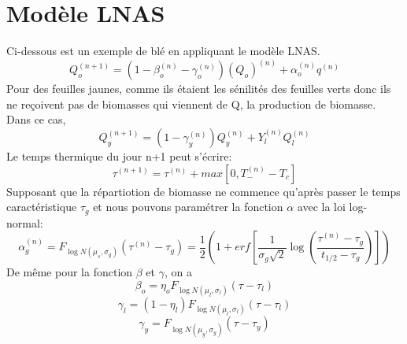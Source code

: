 \section{Modèle LNAS}
Ci-dessous est un exemple de blé en appliquant le modèle LNAS.
\[ {Q_o^{(n+1)}} = (1-\beta_o^{(n)}-\gamma_o^{(n)} )(Q_o)^{(n)} +\alpha_o^{(n)}q^{(n)} \]
Pour des feuilles jaunes, comme ils étaient les sénilités des feuilles verts donc ils ne reçoivent pas de biomasses qui viennent de Q, la production de biomasse. Dans ce cas, 
\[ {Q_y^{(n+1)}}=(1-\gamma_y^{(n)})Q_y^{(n)}+Y_l^{(n)}Q_l^{(n)} \]
Le temps thermique du jour n+1 peut s'écrire:
\[ {\tau}^{(n+1)}=\tau^{(n)}+max[0,T_-^{(n)}-T_c] \]
Supposant que la répartiotion de biomasse ne commence qu'après passer le temps caractéristique $\tau_g$ et  nous pouvons paramétrer la fonction $\alpha$ avec la loi log-normal:
\[ {\alpha_g^{(n)}}=F_{\log N(\mu_s,\sigma_g)}(\tau^{(n)}-\tau_g)=\frac{1}{2} (1+erf[\frac{1}{\sigma_g \sqrt{2}}\log (\frac{\tau^{(n)}-\tau_g}{t_{1/2}-\tau_g})]) \]
De même pour la fonction $\beta $ et $\gamma$, on a
\[ {\beta_o}=\eta_o F_{\log N(\mu_l, \sigma_l)}(\tau-\tau_l) \]
\[ {\gamma_l}=(1-\eta_l)F_{\log N(\mu_l, \sigma_l)}(\tau-\tau_l) \]
\[ {\gamma_y}=F_{\log N(\mu_y, \sigma_y)}(\tau-\tau_y) \]


